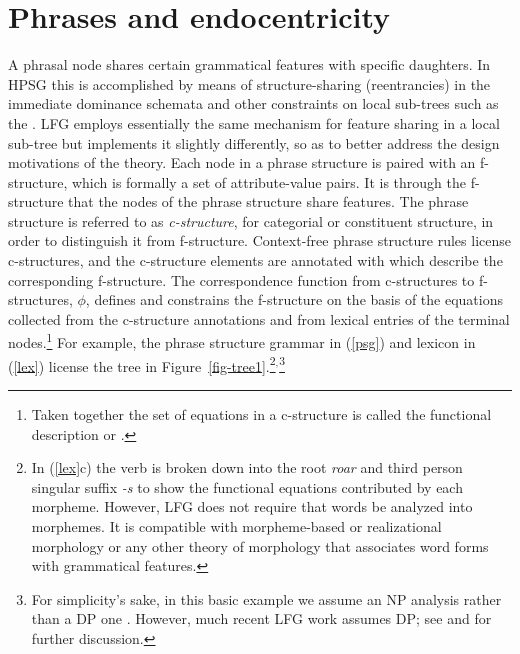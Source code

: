 \section{Phrases and endocentricity} 
A phrasal node shares certain grammatical features with specific daughters. %
In HPSG this is accomplished
by means of structure-sharing (reentrancies) in the immediate dominance schemata and other 
constraints on local sub-trees such as the .  LFG employs essentially the same mechanism for feature sharing in a local sub-tree but implements it slightly differently, so as to better address the design motivations of the theory.  Each node in a phrase structure is paired with an f-structure, which is formally a set of attribute-value pairs.  It is through the f-structure that the nodes of the phrase structure share features.   The phrase structure is referred to as \textit{c-structure}, for categorial or constituent structure, in order to distinguish it from f-structure. 
Context-free phrase structure rules  license c-structures, and the c-structure elements are annotated with  which describe the corresponding f-structure.  
The correspondence function from c-structures to f-structures, $\phi$, defines and constrains the f-structure on the basis of the  equations collected from the c-structure annotations and from lexical entries of the terminal nodes.\footnote{Taken together the set of equations in a c-structure is called the functional description or .}  For example, the phrase structure grammar in (\ref{psg}) and lexicon in (\ref{lex}) license the tree in Figure~\ref{fig-tree1}.\footnote{In (\ref{lex}c) the verb is broken down into the root \textit{roar} and third person singular suffix \textit{-s} to show the functional equations contributed by each morpheme.  However, LFG does not require that words be analyzed into morphemes.  It is compatible with morpheme-based \citep[e.g.,][384--385,395--396]{ishikawa85,BATW2016a} or realizational morphology   \citep[Chapter 12]{dalrymple;ea19} or any other theory of morphology that associates word forms with grammatical features.}$^,$\footnote{For simplicity's sake, in this basic example we assume an NP analysis rather than a DP one \citep{Brame82a}. However, much recent LFG work assumes DP; see \citet{BATW2016a} and \citet{dalrymple;ea19} for further discussion.}

